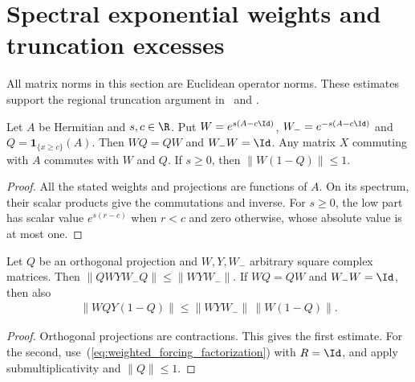 \section{Spectral exponential weights and truncation excesses}

All matrix norms in this section are Euclidean operator norms. These estimates
support the regional truncation argument
in~\cite[lines 1102--1168]{Arad2014Connecting} and
\cite[lines 1010--1024]{Arad2016RigorousRG}.

\begin{theorem}
    \label{thm:exponential_weight_projection}
    \leanok
    Let $A$ be Hermitian and $s,c\in\R$. Put
    $W=e^{s(A-c\Id)}$, $W_-=e^{-s(A-c\Id)}$ and $Q=\mathbf1_{\{x\ge c\}}(A)$.
    Then $WQ=QW$ and $W_-W=\Id$. Any matrix $X$ commuting with $A$ commutes
    with $W$ and $Q$. If $s\ge0$, then $\|W(1-Q)\|\le1$.
\end{theorem}
\begin{proof}
    \leanok
    All the stated weights and projections are functions of $A$.
    On its spectrum, their scalar products give the commutations and inverse.
    For $s\ge0$, the low part has scalar value $e^{s(r-c)}$ when $r<c$
    and zero otherwise, whose absolute value is at most one.
\end{proof}

\begin{theorem}
    \label{thm:weighted_projection_norms}
    \leanok
    Let $Q$ be an orthogonal projection and $W,Y,W_-$ arbitrary square
    complex matrices. Then $\|QWYW_-Q\|\le\|WYW_-\|$.
    If $WQ=QW$ and $W_-W=\Id$, then also
    \begin{align}
        \|WQY(1-Q)\|\le\|WYW_-\|\,\|W(1-Q)\|.
        \label{eq:weighted_forcing_norm}
    \end{align}
\end{theorem}
\begin{proof}
    \leanok
    Orthogonal projections are contractions. This gives the first estimate.
    For the second, use~(\ref{eq:weighted_forcing_factorization}) with $R=\Id$,
    and apply submultiplicativity and $\|Q\|\le1$.
\end{proof}

